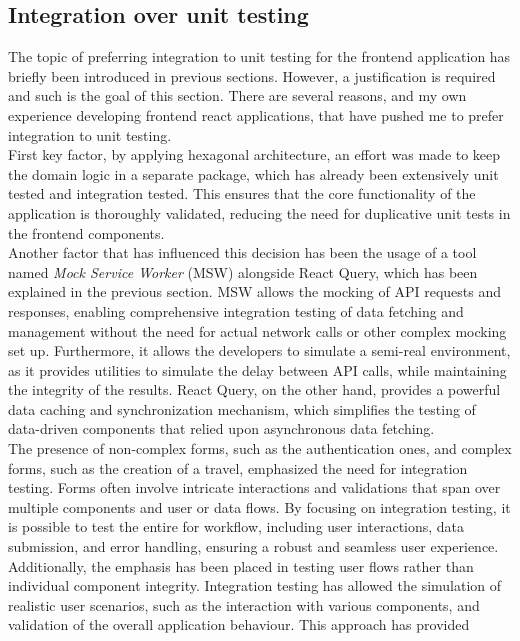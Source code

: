 \documentclass[./memory.tex]{subfiles}
\begin{document}
\subsection{Integration over unit testing}
The topic of preferring integration to unit testing for the frontend
application has briefly been introduced in previous sections. However, a
justification is required and such is the goal of this section. There are
several reasons, and my own experience developing frontend react applications,
that have pushed me to prefer integration to unit testing.
\\[8pt]
First key factor, by applying hexagonal architecture, an effort was made to keep the
domain logic in a separate package, which has already been extensively unit
tested and integration tested. This ensures that the core functionality of the
application is thoroughly validated, reducing the need for duplicative unit
tests in the frontend components.
\\[8pt]
Another factor that has influenced this decision has been the usage of a tool
named \emph{Mock Service Worker} (MSW) alongside React Query, which has been
explained in the previous section. MSW allows the mocking of API requests and
responses, enabling comprehensive integration testing of data fetching and
management without the need for actual network calls or other complex mocking
set up. Furthermore, it allows the developers to simulate a semi-real
environment, as it provides utilities to simulate the delay between API calls,
while maintaining the integrity of the results. React Query, on the other hand,
provides a powerful data caching and synchronization mechanism, which simplifies
the testing of data-driven components that relied upon asynchronous data
fetching.
\\[8pt]
The presence of non-complex forms, such as the authentication ones, and complex
forms, such as the creation of a travel, emphasized the need for integration
testing. Forms often involve intricate interactions and validations that span
over multiple components and user or data flows. By focusing on integration
testing, it is possible to test the entire for workflow, including user
interactions, data submission, and error handling, ensuring a robust and
seamless user experience.
\\[8pt]
Additionally, the emphasis has been placed in testing user flows rather than
individual component integrity. Integration testing has allowed the simulation
of realistic user scenarios, such as the interaction with various components,
and validation of the overall application behaviour. This approach has provided
\end{document}
